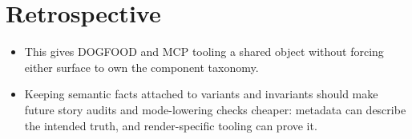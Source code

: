 \section{Retrospective}\label{record-125-retrospective}

\begin{itemize}
\tightlist
\item
  This gives DOGFOOD and MCP tooling a shared object without forcing either surface to own the component taxonomy.
\item
  Keeping semantic facts attached to variants and invariants should make future story audits and mode-lowering checks cheaper: metadata can describe the intended truth, and render-specific tooling can prove it.
\end{itemize}

